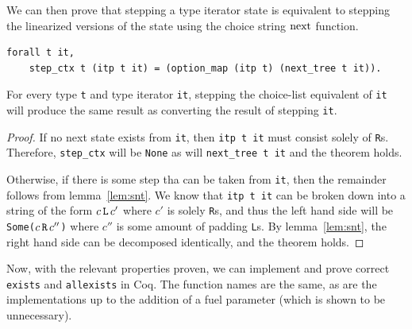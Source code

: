 \documentclass[a4paper,english]{lipics-v2019}
\renewcommand{\L}{{\tt L}\xspace}
\newcommand{\Ls}{{\tt L}s\xspace}
\newcommand{\R}{{\tt R}\xspace}
\newcommand{\Rs}{{\tt R}s\xspace}
\renewcommand{\c}[1]{\ensuremath{\text{\lstinline{#1}}}\xspace}
\begin{document}
We can then prove that stepping a type iterator state is equivalent to
stepping the linearized versions of the state using the choice string
\c{next} function.


\begin{lemma}
\begin{small}\begin{verbatim}
forall t it,
    step_ctx t (itp t it) = (option_map (itp t) (next_tree t it)).
\end{verbatim}\end{small}
For every type \verb|t| and type iterator \verb|it|,
stepping the choice-list equivalent of \verb|it| will
produce the same result as converting the result of stepping
\verb|it|.
\end{lemma}
\begin{proof}
If no next state exists from \verb|it|, then
\verb|itp t it| must consist solely of \Rs. Therefore, \verb|step_ctx| will be \verb|None| as 
will \verb|next_tree t it| and the theorem holds. 

Otherwise, if there is some step tha can be taken from \verb|it|, then 
the remainder follows from lemma~\ref{lem:snt}. We know that \verb|itp t it| can
be broken down into a string of the form $c\,\L\,c'$ where $c'$ is solely \Rs, and thus
the left hand side will be \verb|Some(|$c\,\R\,c''$\verb|)| where $c''$ is some amount of 
padding \Ls. By lemma~\ref{lem:snt}, the right hand side can be decomposed identically, and the theorem holds.
\end{proof}

Now, with the relevant properties proven, we can implement and prove correct
\verb|exists| and \verb|allexists| in Coq. The function names are the
same, as are the implementations up to the addition of a fuel parameter (which
is shown to be unnecessary). 
\end{document}
